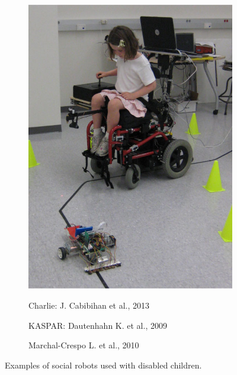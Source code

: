 \documentclass[a4paper,twoside]{book}
\begin{document}
\begin{figure}[h]
\begin{subfigure}[b]{0.3\textwidth}
\end{subfigure}\quad
\begin{subfigure}[b]{0.3\textwidth}
\includegraphics[width=\textwidth]{img/Marchal-Crespo}
\end{subfigure}

\begin{subfigure}[t]{0.3\textwidth}
\caption{Charlie: J. Cabibihan et al., 2013}
\end{subfigure}\quad
\begin{subfigure}[t]{0.3\textwidth}
\caption{KASPAR: Dautenhahn K. et al., 2009}
\end{subfigure}\quad
\begin{subfigure}[t]{0.3\textwidth}
\caption{Marchal-Crespo L. et al., 2010}
\end{subfigure}

\caption{Examples of social robots used with disabled children.}
\end{figure}
\end{document}

